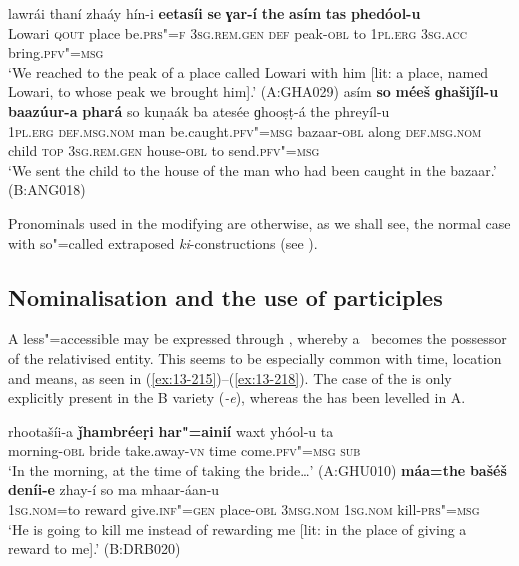\ex
\label{ex:13-213}
\gll lawrái thaní zhaáy hín-i    \textbf{eetasíi} \textbf{se} \textbf{ɣar-í} \textbf{the} \textbf{asím} \textbf{tas} \textbf{    phedóol-u}\\
Lowari \textsc{qout} place be.\textsc{prs"=f} \textsc{3sg.rem.gen} \textsc{def} peak-\textsc{obl} to \textsc{1pl.erg} \textsc{3sg.acc} bring.\textsc{pfv"=msg}\\
\glt `We reached to the peak of a place called Lowari with him [lit: a place, named Lowari, to whose peak we brought him].' (A:GHA029)
\ex
\label{ex:13-214}
\gll asím \textbf{so} \textbf{méeš} \textbf{ɡhašiǰíl-u} \textbf{baazúur-a} \textbf{phará} so kuṇaák ba atesée ɡhooṣṭ-á the phreyíl-u\\
\textsc{1pl.erg} \textsc{def.msg.nom} man be.caught.\textsc{pfv"=msg} bazaar-\textsc{obl} along \textsc{def.msg.nom} child \textsc{top} \textsc{3sg.rem.gen} house-\textsc{obl} to send.\textsc{pfv"=msg}\\
\glt `We sent the child to the house of the man who had been caught in the bazaar.' (B:ANG018) 
\z

Pronominals used in the modifying  are otherwise, as we shall see, the normal case with so"=called extraposed \textit{ki}-constructions (see ). 


\subsection{Nominalisation and the use of participles}
\label{subsec:13-6-6}

A less"=accessible   may be expressed through , whereby a~ becomes the possessor of the relativised entity. This seems to be especially common with time, location and means, as seen in (\ref{ex:13-215})--(\ref{ex:13-218}). The  case of the  is only explicitly present in the B variety (\textit{-e}), whereas the  has been levelled in A.

\ea
\label{ex:13-215}
\gll rhootašíi-a \textbf{ǰhambréeṛi} \textbf{har"=ainií} waxt  yhóol-u ta \\
morning-\textsc{obl} bride take.away-\textsc{vn} time come.\textsc{pfv"=msg} \textsc{sub} \\
\glt `In the morning, at the time of taking the bride{\ldots}' (A:GHU010)
\ex
\label{ex:13-216}
\gll \textbf{máa=the} \textbf{bašéš} \textbf{deníi-e} zhay-í so  ma mhaar-áan-u\\
\textsc{1sg.nom}=to reward give.\textsc{inf"=gen} place-\textsc{obl} \textsc{3msg.nom} \textsc{1sg.nom} kill-\textsc{prs"=msg}\\
\glt `He is going to kill me instead of rewarding me [lit: in the place of giving a reward to me].' (B:DRB020)

